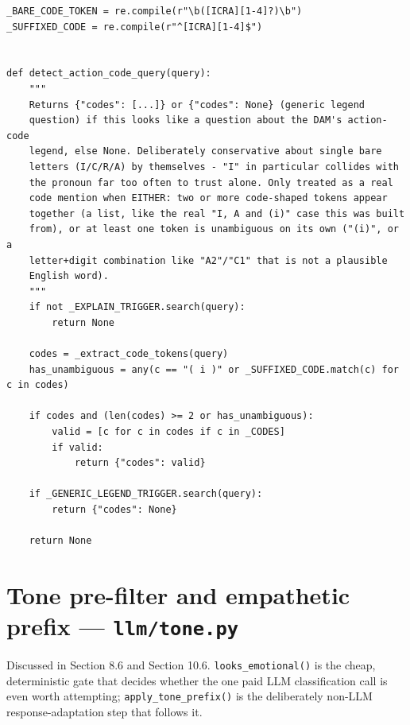 \begin{lstlisting}[caption={agent/action\_codes.py — detect\_action\_code\_query}]
_BARE_CODE_TOKEN = re.compile(r"\b([ICRA][1-4]?)\b")
_SUFFIXED_CODE = re.compile(r"^[ICRA][1-4]$")


def detect_action_code_query(query):
    """
    Returns {"codes": [...]} or {"codes": None} (generic legend
    question) if this looks like a question about the DAM's action-code
    legend, else None. Deliberately conservative about single bare
    letters (I/C/R/A) by themselves - "I" in particular collides with
    the pronoun far too often to trust alone. Only treated as a real
    code mention when EITHER: two or more code-shaped tokens appear
    together (a list, like the real "I, A and (i)" case this was built
    from), or at least one token is unambiguous on its own ("(i)", or a
    letter+digit combination like "A2"/"C1" that is not a plausible
    English word).
    """
    if not _EXPLAIN_TRIGGER.search(query):
        return None

    codes = _extract_code_tokens(query)
    has_unambiguous = any(c == "( i )" or _SUFFIXED_CODE.match(c) for c in codes)

    if codes and (len(codes) >= 2 or has_unambiguous):
        valid = [c for c in codes if c in _CODES]
        if valid:
            return {"codes": valid}

    if _GENERIC_LEGEND_TRIGGER.search(query):
        return {"codes": None}

    return None
\end{lstlisting}
\section{Tone pre-filter and empathetic prefix — \texttt{llm/\allowbreak{}tone.py}}
Discussed in Section 8.6 and Section 10.6. \texttt{looks\_\allowbreak{}emotional()} is the cheap, deterministic gate that decides whether the one paid LLM classification call is even worth attempting; \texttt{apply\_\allowbreak{}tone\_\allowbreak{}prefix()} is the deliberately non-LLM response-adaptation step that follows it.

